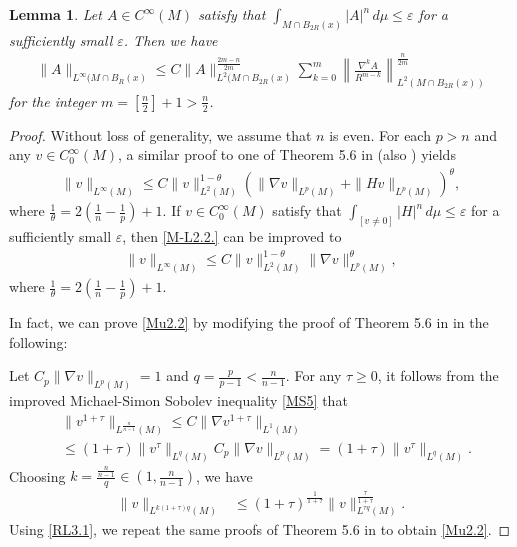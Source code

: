 \documentclass{amsart}
\newtheorem{lemma}[theorem]{Lemma}
\theoremstyle{definition}
\numberwithin{equation}{section}
\begin{document}
\begin{lemma}Let $A\in
C^{\infty}(M)$ satisfy  that $\int_{M \cap B_{2R}(x)}|A|^n\,d\mu\leq \varepsilon$ for a sufficiently small $\varepsilon$.
Then we have
\begin{align}\label{Ife}
\|A\|_{L^{\infty}(M \cap B_{R}(x)}\leq C\| A\|^{\frac {2m-n}  {2m} }_{L^2( M \cap B_{2R}(x)}\sum_{k=0}^{ m}
\left \|\frac {\nabla^k A}{R^{m -k}}\right \|^{\frac n
{2m}}_{L^2( M \cap B_{2R}(x)) }
\end{align}
for the integer $m=[\frac n2 ]+1> \frac n 2$.
\end{lemma}
\begin{proof} Without loss of generality, we assume that $n$ is even.
 For each $p>n$ and any $v\in
C_0^{\infty}(M)$, a similar proof  to  one of Theorem 5.6 in \cite{KS1}  (also \cite{LSU}) yields
\begin{align}\label{M-L2.2.}
\|v\|_{L^{\infty}(M)}\leq C \|v\|_{L^2(M)}^{1-\theta}\left (\|\nabla v\|_{L^p(M)}+\|H v\|_{L^p(M)}\right )^{\theta},
\end{align}
where $\frac 1{\theta}=2\left (\frac 1 n-\frac 1 p \right )+1$.
If $v\in
C_0^{\infty}(M)$ satisfy  that $\int_{[v\neq 0]}|H|^n\,d\mu\leq \varepsilon$ for a sufficiently small $\varepsilon$, then
\eqref{M-L2.2.} can be improved to
\begin{align}\label{Mu2.2}
\|v\|_{L^{\infty}(M)}\leq C \|v\|_{L^2(M)}^{1-\theta}\|\nabla v\|_{L^p(M)}^{\theta},
\end{align}
where $\frac 1{\theta}=2\left (\frac 1 n-\frac 1 p \right )+1$.

In fact, we can  prove \eqref{Mu2.2} by modifying the proof of Theorem 5.6 in \cite{KS1}  in  the following:

Let $C_p\|\nabla v\|_{L^p(M)}=1$ and $q=\frac p{p-1}<\frac n{n-1}$. For any $\tau\geq 0$, it follows from the improved Michael-Simon Sobolev inequality \eqref{MS5} that
\begin{align*}
&\|v^{1+\tau}\|_{L^{ \frac n{n-1}}(M)}\leq  C  \|\nabla v^{1+\tau}\|_{L^1(M)} \\
&\leq (1+\tau )    \| v^{\tau}\|_{L^q(M)} C_p\|\nabla v\|_{L^p(M)}  = ( 1+\tau )    \| v^{\tau}\|_{L^q(M)}.  \end{align*}
Choosing $k= \frac {\frac n{n-1}} q\in (1, \frac n{n-1})$, we have
 \begin{align}\label{RL3.1}
\|v\|_{L^{k(1+\tau )q }(M)}
&\leq   ( 1+\tau )^{\frac 1 {1+\tau} }   \| v \|_{L^{\tau q}(M)}^{\frac {\tau }{1+\tau }}.  \end{align}
Using \eqref{RL3.1}, we repeat the same proofs of Theorem 5.6 in \cite{KS1}  to obtain \eqref{Mu2.2}.



\end{proof}
\end{document}
